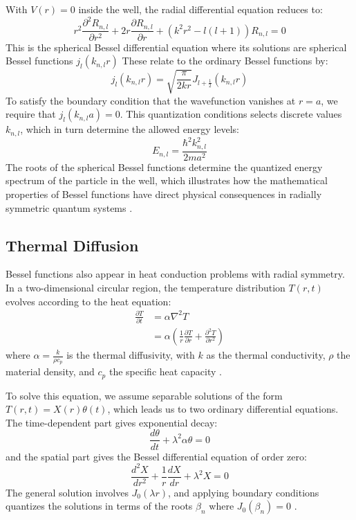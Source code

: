 \documentclass[linenumbers, twocolumn]{aastex631}
\begin{document}
\noindent With $V(r)=0$ inside the well, the radial differential equation
reduces to:
\begin{equation}
    r^2\frac{\partial^2 R_{n,l}}{\partial r^2} + 2r\frac{\partial R_{n,l}}{\partial r} +(k^2r^2-l(l+1))R_{n,l}=0
\end{equation}
\noindent This is the spherical Bessel differential equation where its solutions
are spherical Bessel functions $j_l(k_{n,l}r)$ These relate to the ordinary
Bessel functions by:
\begin{equation}
    j_l(k_{n,l}r)=\sqrt{\frac{\pi}{2kr}}J_{l+\frac{1}{2}}(k_{n,l}r)
\end{equation}
\noindent To satisfy the boundary condition that the wavefunction vanishes at
$r=a$, we require that $j_l(k_{n,l}a)=0$. This quantization conditions selects
discrete values $k_{n,l}$, which in turn determine the allowed energy levels:
\begin{equation}
    E_{n,l}=\frac{\hbar^2k_{n,l}^2}{2ma^2}
\end{equation}
\noindent The roots of the spherical Bessel functions determine the
quantized energy spectrum of the particle in the well, which illustrates how
the mathematical properties of Bessel functions have direct physical 
consequences in radially symmetric quantum systems \cite{weisstein}.\\


\subsection{Thermal Diffusion}

Bessel functions also appear in heat conduction problems with radial symmetry.
In a two-dimensional circular region, the temperature distribution $T(r,t)$
evolves according to the heat equation:
\begin{align}
    \frac{\partial T}{\partial t}&=\alpha\nabla^2T\\
    &=\alpha\left(\frac{1}{r} \frac{\partial T}{\partial r} + \frac{\partial^2 T}{\partial r^2}\right)
\end{align}
\noindent where  $\alpha=\frac{k}{\rho c_p}$ is the thermal diffusivity, with
$k$ as the thermal conductivity, $\rho$ the material density, and $c_p$ the
specific heat capacity \cite{hahn}.

\noindent To solve this equation, we assume separable solutions of the form
$T(r,t)=X(r)\theta(t)$, which leads us to two ordinary differential equations.
The time-dependent part gives exponential decay:
\begin{equation}
    \frac{d\theta}{dt}+\lambda^2\alpha\theta=0
\end{equation}
\noindent and the spatial part gives the Bessel differential equation
of order zero:
\begin{equation}
    \frac{d^2X}{dr^2}+\frac{1}{r}\frac{dX}{dr}+\lambda^2X=0
\end{equation}
\noindent The general solution involves $J_0(\lambda r)$, and applying boundary
conditions quantizes the solutions in terms of the roots $\beta_n$ where
$J_0(\beta_n)=0$ \cite{tsega}.
\end{document}
